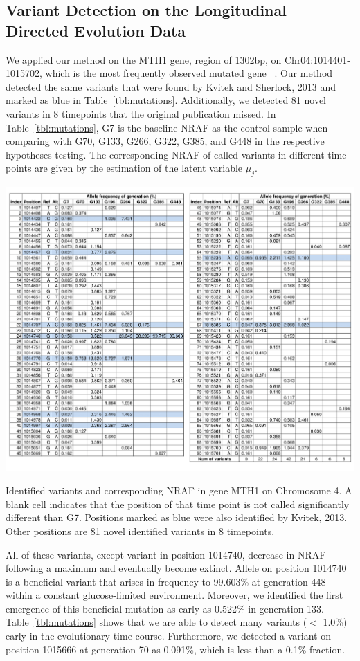 \documentclass[11pt,reqno]{amsart}
\begin{document}
\subsection{Variant Detection on the Longitudinal Directed Evolution Data}
We applied our method on the MTH1 gene, region of 1302bp, on Chr04:1014401-1015702, which is the most frequently observed mutated gene ~\citep{kvitek2013whole}.
Our method detected the same variants that were found by Kvitek and Sherlock, 2013 and marked as blue in Table~\ref{tbl:mutations}.
Additionally, we detected 81 novel variants in 8 timepoints that the original publication missed.
In Table~\ref{tbl:mutations}, G7 is the baseline NRAF as the control sample when comparing with G70, G133, G266, G322, G385, and G448 in the respective hypotheses testing.
The corresponding NRAF of called variants in different time points are given by the estimation of the latent variable $\mu_j$.
\begin{table}[htbp]
\centering
\includegraphics[width=1.0\textwidth]{tables/mutations_MTH1.png}
\caption{Identified variants and corresponding NRAF in gene MTH1 on Chromosome 4.
A blank cell indicates that the position of that time point is not called significantly different than G7.
Positions marked as blue were also identified by Kvitek, 2013.
Other positions are 81 novel identified variants in 8 timepoints.}
\label{tbl:mutations}
\end{table}
All of these variants, except variant in position 1014740, decrease in NRAF following a maximum and eventually become extinct.
Allele on position 1014740 is a beneficial variant that arises in frequency to 99.603\% at generation 448 within a constant glucose-limited environment.
Moreover, we identified the first emergence of this beneficial mutation as early as 0.522\% in generation 133.
Table~\ref{tbl:mutations} shows that we are able to detect many variants ($<$ 1.0\%) early in the evolutionary time course.
Furthermore, we detected a variant on position 1015666 at generation 70 as 0.091\%, which is less than a 0.1\% fraction.
\end{document}
